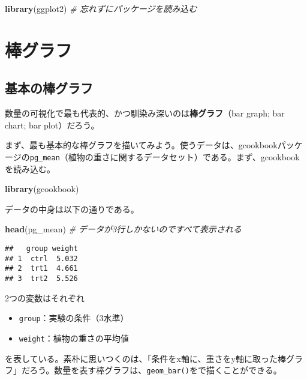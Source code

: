 \documentclass[]{book}
\newenvironment{Shaded}{\begin{snugshade}}{\end{snugshade}}
\newcommand{\KeywordTok}[1]{\textcolor[rgb]{0.13,0.29,0.53}{\textbf{#1}}}
\newcommand{\CommentTok}[1]{\textcolor[rgb]{0.56,0.35,0.01}{\textit{#1}}}
\newcommand{\NormalTok}[1]{#1}
\begin{document}
\begin{Shaded}
\begin{Highlighting}[]
\KeywordTok{library}\NormalTok{(ggplot2) }\CommentTok{# 忘れずにパッケージを読み込む}
\end{Highlighting}
\end{Shaded}

\section{棒グラフ}

\subsection{基本の棒グラフ}

数量の可視化で最も代表的、かつ馴染み深いのは\textbf{棒グラフ}（bar
graph; bar chart; bar plot）だろう。

まず、最も基本的な棒グラフを描いてみよう。使うデータは、gcookbookパッケージの\texttt{pg\_mean}（植物の重さに関するデータセット）である。まず、gcookbookを読み込む。

\begin{Shaded}
\begin{Highlighting}[]
\KeywordTok{library}\NormalTok{(gcookbook)}
\end{Highlighting}
\end{Shaded}

データの中身は以下の通りである。

\begin{Shaded}
\begin{Highlighting}[]
\KeywordTok{head}\NormalTok{(pg_mean) }\CommentTok{# データが3行しかないのですべて表示される}
\end{Highlighting}
\end{Shaded}

\begin{verbatim}
##   group weight
## 1  ctrl  5.032
## 2  trt1  4.661
## 3  trt2  5.526
\end{verbatim}

2つの変数はそれぞれ

\begin{itemize}
\item
  \texttt{group}：実験の条件（3水準）
\item
  \texttt{weight}：植物の重さの平均値
\end{itemize}

を表している。素朴に思いつくのは、「条件をx軸に、重さをy軸に取った棒グラフ」だろう。数量を表す棒グラフは、\texttt{geom\_bar()}をで描くことができる。
\end{document}
